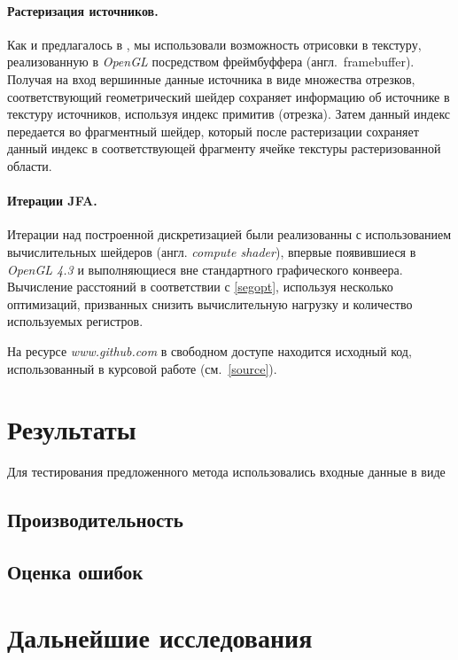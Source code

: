 \documentclass[12pt]{article}
\begin{document}
\paragraph{Растеризация источников.} Как и предлагалось в \cite{gvd}, мы 
использовали возможность отрисовки в текстуру, реализованную в \emph{OpenGL}
посредством фреймбуффера (англ.~framebuffer). Получая на вход вершинные данные
источника в виде множества отрезков, соответствующий геометрический шейдер 
сохраняет информацию об источнике в текстуру источников, используя индекс
примитив (отрезка). Затем данный индекс передается во фрагментный шейдер,
который после растеризации сохраняет данный индекс в соответствующей фрагменту
ячейке текстуры растеризованной области.

\paragraph{Итерации JFA.} Итерации над построенной дискретизацией были
реализованны с использованием вычислительных шейдеров (англ. \emph{compute shader}),
впервые появившиеся в \emph{OpenGL 4.3} и выполняющиеся вне стандартного
графического конвеера. Вычисление расстояний в соответствии с \ref{segopt},
используя несколько оптимизаций, призванных снизить вычислительную нагрузку и 
количество используемых регистров.

На ресурсе \emph{www.github.com} в свободном доступе находится исходный код, 
использованный в курсовой работе (см.~\ref{source}).

\section{Результаты}
Для тестирования предложенного метода использовались входные данные в виде 

\subsection{Производительность}

\subsection{Оценка ошибок}

\section{Дальнейшие исследования}
\end{document}
